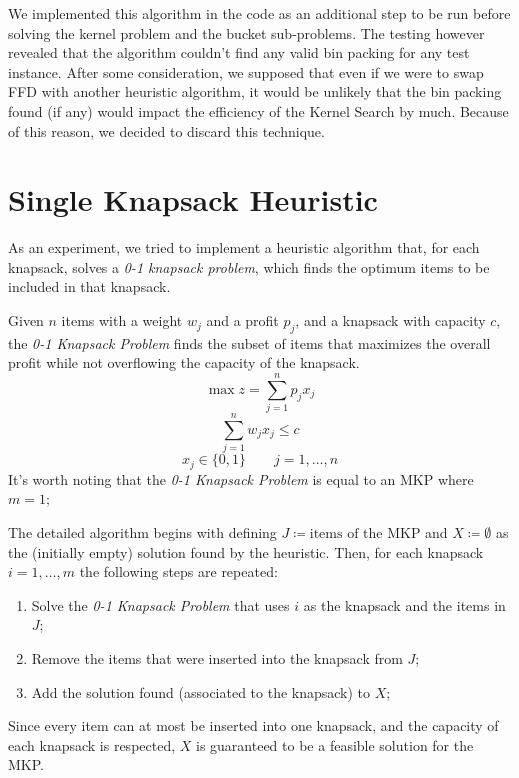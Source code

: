We implemented this algorithm in the code as an additional step to be run
before solving the kernel problem and the bucket sub-problems.
The testing however revealed that the algorithm couldn't find any valid bin packing
for any test instance.
After some consideration, we supposed that even if we were to swap FFD with another
heuristic algorithm, it would be unlikely that the bin packing found (if any) would impact the efficiency of the Kernel Search by much.
Because of this reason, we decided to discard this technique.


\section{Single Knapsack Heuristic}
As an experiment, we tried to implement a heuristic algorithm that,
for each knapsack, solves a \textit{0-1 knapsack problem},
which finds the optimum items to be included in that knapsack.

Given \(n\) items with a weight \(w_{j}\) and a profit \(p_{j}\),
and a knapsack with capacity \(c\), the \textit{0-1 Knapsack Problem} finds
the subset of items that maximizes the overall profit while not overflowing the capacity of the knapsack.
\begin{equation}
    \max{z} = \sum_{j=1}^{n} p_{j} x_{j}
\end{equation}
\begin{equation}
    \sum_{j=1}^{n} w_{j} x_{j} \leq c
\end{equation}
\begin{equation}
    x_{j} \in \{0,1\} \qquad j=1,\dots,n
\end{equation}
It's worth noting that the \textit{0-1 Knapsack Problem} is equal to an MKP
where \(m=1\);

The detailed algorithm begins with defining \(J \coloneqq \text{items of the MKP}\)
and \(X \coloneqq \emptyset\) as the (initially empty) solution found by the heuristic.
Then, for each knapsack \(i = 1,\dots,m\) the following steps are repeated:
\begin{enumerate}
    \item Solve the \textit{0-1 Knapsack Problem} that uses \(i\) as the knapsack and the items in \(J\);
    \item Remove the items that were inserted into the knapsack from \(J\);
    \item Add the solution found (associated to the knapsack) to \(X\);
\end{enumerate}
Since every item can at most be inserted into one knapsack, and the capacity of each
knapsack is respected, \(X\) is guaranteed to be a feasible solution for the MKP\@.

